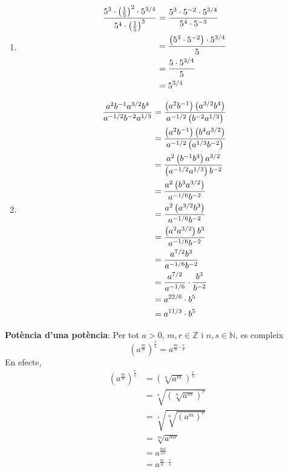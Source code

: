 \begin{enumerate}
\item 
\begin{align*}
\frac{5^{3}\cdot \left( \frac{1}{5}\right) ^{2}\cdot 5^{3/4}}{5^{4}\cdot
\left( \frac{1}{5}\right) ^{3}} &=\frac{5^{3}\cdot 5^{-2}\cdot 5^{3/4}}{%
5^{4}\cdot 5^{-3}} \\
&=\frac{\left( 5^{3}\cdot 5^{-2}\right) \cdot 5^{3/4}}{5} \\
&=\frac{5\cdot 5^{3/4}}{5} \\
&=5^{3/4}
\end{align*}

\item 
\begin{align*}
\frac{a^{2}b^{-1}a^{3/2}b^{4}}{a^{-1/2}b^{-2}a^{1/3}} &=\frac{\left(
a^{2}b^{-1}\right) \left( a^{3/2}b^{4}\right) }{a^{-1/2}\left(
b^{-2}a^{1/3}\right) } \\
&=\frac{\left( a^{2}b^{-1}\right) \left( b^{4}a^{3/2}\right) }{%
a^{-1/2}\left( a^{1/3}b^{-2}\right) } \\
&=\frac{a^{2}\left( b^{-1}b^{4}\right) a^{3/2}}{\left(
a^{-1/2}a^{1/3}\right) b^{-2}} \\
&=\frac{a^{2}\left( b^{3}a^{3/2}\right) }{a^{-1/6}b^{-2}} \\
&=\frac{a^{2}\left( a^{3/2}b^{3}\right) }{a^{-1/6}b^{-2}} \\
&=\frac{\left( a^{2}a^{3/2}\right) b^{3}}{a^{-1/6}b^{-2}} \\
&=\frac{a^{7/2}b^{3}}{a^{-1/6}b^{-2}} \\
&=\frac{a^{7/2}}{a^{-1/6}}\cdot \frac{b^{3}}{b^{-2}} \\
&=a^{22/6}\cdot b^{5} \\
&=a^{11/3}\cdot b^{5}
\end{align*}
\end{enumerate}

\textbf{Potència d’una potència}: Per tot $a>0$, $m,r\in \mathbb{Z}$ i $%
n,s\in \mathbb{N}$, es compleix%
\begin{equation*}
\left( a^{\frac{m}{n}}\right) ^{\frac{r}{s}}=a^{\frac{m}{n}\cdot \frac{r}{s}}
\end{equation*}%
En efecte,%
\begin{align*}
\left( a^{\frac{m}{n}}\right) ^{\frac{r}{s}} &=\left( \sqrt[n]{a^{m}}%
\right) ^{\frac{r}{s}} \\
&=\sqrt[s]{\left( \sqrt[n]{a^{m}}\right) ^{r}} \\
&=\sqrt[s]{\sqrt[n]{\left( a^{m}\right) ^{r}}} \\
&=\sqrt[ns]{a^{mr}} \\
&=a^{\frac{mr}{ns}} \\
&=a^{\frac{m}{n}\cdot \frac{r}{s}}
\end{align*}


